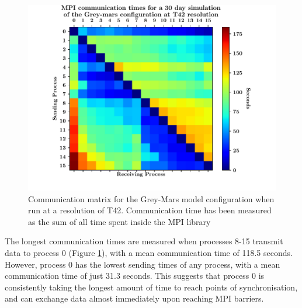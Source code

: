 \documentclass[a4paper,11pt]{report}
\begin{document}
\begin{figure}[htbp]
\begin{center}
\includegraphics[width=1\textwidth]{img/comm_mat_grey-mars.pdf}
\caption[Communication matrix for the Grey-Mars model configuration]{Communication matrix for the Grey-Mars model configuration when run at a resolution of T42. Communication time has been measured as the sum of all time spent inside the MPI library}
\label{fig:comm_mat}
\end{center}
\end{figure}
\par
The longest communication times are measured when processes 8-15 transmit data to process 0 (Figure \ref{fig:comm_mat}), with a mean communication time of 118.5 seconds. However, process 0 has the lowest sending times of any process, with a mean communication time of just 31.3 seconds. This suggests that process 0 is consistently taking the longest amount of time to reach points of synchronisation, and can exchange data almost immediately upon reaching MPI barriers. 
\end{document}
